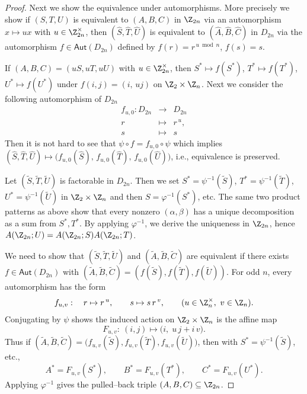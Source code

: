 \documentclass{file}
\newcommand{\Aut}{\mathsf{Aut}}
\begin{document}
\begin{proof}
Next we show the equivalence under automorphisms.
More precisely we show
if $(S,T,U)$ is equivalent to $(A,B,C)$ in $\Z_{2n}$ via an automorphism
$x\mapsto ux$ with $u\in\Z_{2n}^\times$, then 
$(\widehat S,\widehat T,\widehat U)$ is equivalent to $(\widehat A,\widehat B,\widehat C)$
in $D_{2n}$ via the automorphism $f\in\Aut(D_{2n})$ defined by $f(r)=r^{\,u\bmod n}$, $f(s)=s$.

If $(A,B,C)=(uS,uT,uU)$ with $u\in\Z_{2n}^\times$, then
$S^*\mapsto f(S^*)$, $T^*\mapsto f(T^*)$, $U^*\mapsto f(U^*)$ under
$f(i,j)=(i,\,u j)$ on $\Z_2\times\Z_n$. 
Next we consider the following automorphism of $D_{2n}$
\[
\begin{array}{rcl}
f_{u,0} \colon D_{2n} &\longrightarrow& D_{2n} \\[4pt]
r &\longmapsto& r^{\,u}, \\[2pt]
s &\longmapsto& s
\end{array}
\]
Then it is not hard to see that 
$\psi\circ f=f_{u,0}\circ \psi$
 which implies $(\widehat S,\widehat T,\widehat U)\mapsto
\bigl(f_{u,0}(\widehat S),\,f_{u,0}(\widehat T),\,f_{u,0}(\widehat U)\bigr)$,
i.e., equivalence is preserved. 

Let $(\widetilde S,\widetilde T,\widetilde U)$ is factorable in $D_{2n}$.
Then we set
$S^*=\psi^{-1}(\widetilde S)$, $T^*=\psi^{-1}(\widetilde T)$, $U^*=\psi^{-1}(\widetilde U)$
in $\Z_2\times\Z_n$ and then $S=\varphi^{-1}(S^*)$, etc.
The same two product patterns as above show that every nonzero $(\alpha,\beta)$
has a unique decomposition as a sum from $S^*,T^*$.
By applying $\varphi^{-1}$, we derive the uniqueness in $\Z_{2n}$, hence $A(\Z_{2n};U)=A(\Z_{2n};S)A(\Z_{2n};T)$.

We need to show that
$(\widetilde S,\widetilde T,\widetilde U)$ and $(\widetilde A,\widetilde B,\widetilde C)$
are equivalent if there exists $f\in\Aut(D_{2n})$ with
$(\widetilde A,\widetilde B,\widetilde C)=(f(\widetilde S),f(\widetilde T),f(\widetilde U))$.
For odd $n$, every automorphism has the form
\[
f_{u,v}:\quad r\mapsto r^{\,u},\qquad s\mapsto s\,r^{\,v},
\qquad (u\in\Z_n^{\times},\ v\in\Z_n).
\]
Conjugating by $\psi$ shows the induced action on $\Z_2\times\Z_n$ is the affine map
\[
F_{u,v}:\ (i,j)\longmapsto\bigl(i,\;u\,j+i\,v\bigr).
\]
Thus if $(\widetilde A,\widetilde B,\widetilde C)=\bigl(f_{u,v}(\widetilde S),f_{u,v}(\widetilde T),
f_{u,v}(\widetilde U)\bigr)$, then with $S^*=\psi^{-1}(\widetilde S)$, etc.,
\[
A^*=F_{u,v}(S^*),\qquad B^*=F_{u,v}(T^*),\qquad C^*=F_{u,v}(U^*).
\]
Applying $\varphi^{-1}$ gives the pulled–back triple $(A,B,C)\subseteq\Z_{2n}$.



\end{proof}
\end{document}
